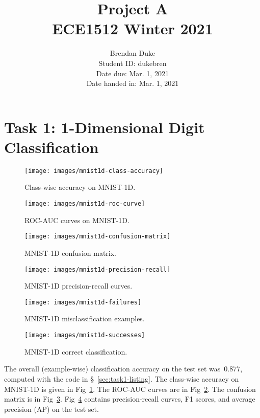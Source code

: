 \documentclass{article}
\title{Project A \\ECE1512 Winter 2021}
\author{Brendan Duke\\Student ID: dukebren\\Date due: Mar. 1, 2021\\Date handed in: Mar. 1, 2021}
\date{}
\begin{document}
\maketitle
\clearpage


\section{Task 1: 1-Dimensional Digit Classification}

\begin{figure}[t]
	\texttt{[image: images/mnist1d-class-accuracy]}
	\caption{\label{fig:mnist1d-classwise-accuracy}Class-wise accuracy on MNIST-1D\@.}
\end{figure}

\begin{figure}[t]
	\texttt{[image: images/mnist1d-roc-curve]}
	\caption{\label{fig:mnist1d-roc-curve}ROC-AUC curves on MNIST-1D\@.}
\end{figure}

\begin{figure}[t]
	\texttt{[image: images/mnist1d-confusion-matrix]}
	\caption{\label{fig:mnist1d-confusion-matrix}MNIST-1D confusion matrix.}
\end{figure}

\begin{figure}[t]
	\texttt{[image: images/mnist1d-precision-recall]}
	\caption{\label{fig:mnist1d-precision-recall}MNIST-1D precision-recall curves.}
\end{figure}

\begin{figure}[t]
	\texttt{[image: images/mnist1d-failures]}
	\caption{\label{fig:mnist1d-failures}MNIST-1D misclassification examples.}
\end{figure}

\begin{figure}[t]
	\texttt{[image: images/mnist1d-successes]}
	\caption{\label{fig:mnist1d-successes}MNIST-1D correct classification.}
\end{figure}

The overall (example-wise) classification accuracy on the test set was~\num{0.877}, computed with the code in \S~\ref{sec:task1-listing}.
The class-wise accuracy on MNIST-1D is given in Fig~\ref{fig:mnist1d-classwise-accuracy}.
The ROC-AUC curves are in Fig~\ref{fig:mnist1d-roc-curve}.
The confusion matrix is in Fig~\ref{fig:mnist1d-confusion-matrix}.
Fig~\ref{fig:mnist1d-precision-recall} contains precision-recall curves, F1 scores, and average precision (AP) on the test set.
\end{document}
